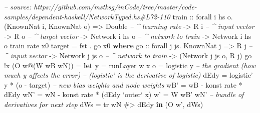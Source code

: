 \documentclass[]{article}
\newenvironment{Shaded}{}{}
\newcommand{\KeywordTok}[1]{\textcolor[rgb]{0.00,0.44,0.13}{\textbf{{#1}}}}
\newcommand{\DataTypeTok}[1]{\textcolor[rgb]{0.56,0.13,0.00}{{#1}}}
\newcommand{\CommentTok}[1]{\textcolor[rgb]{0.38,0.63,0.69}{\textit{{#1}}}}
\newcommand{\OtherTok}[1]{\textcolor[rgb]{0.00,0.44,0.13}{{#1}}}
\newcommand{\FunctionTok}[1]{\textcolor[rgb]{0.02,0.16,0.49}{{#1}}}
\newcommand{\NormalTok}[1]{{#1}}
\begin{document}
\begin{Shaded}
\begin{Highlighting}[]
\CommentTok{-- source: https://github.com/mstksg/inCode/tree/master/code-samples/dependent-haskell/NetworkTyped.hs#L72-110}
\OtherTok{train ::} \NormalTok{forall i hs o}\FunctionTok{.} \NormalTok{(}\DataTypeTok{KnownNat} \NormalTok{i, }\DataTypeTok{KnownNat} \NormalTok{o)}
      \OtherTok{=>} \DataTypeTok{Double}           \CommentTok{-- ^ learning rate}
      \OtherTok{->} \DataTypeTok{R} \NormalTok{i              }\CommentTok{-- ^ input vector}
      \OtherTok{->} \DataTypeTok{R} \NormalTok{o              }\CommentTok{-- ^ target vector}
      \OtherTok{->} \DataTypeTok{Network} \NormalTok{i hs o   }\CommentTok{-- ^ network to train}
      \OtherTok{->} \DataTypeTok{Network} \NormalTok{i hs o}
\NormalTok{train rate x0 target }\FunctionTok{=} \NormalTok{fst }\FunctionTok{.} \NormalTok{go x0}
  \KeywordTok{where}
\OtherTok{    go  ::} \NormalTok{forall j js}\FunctionTok{.} \DataTypeTok{KnownNat} \NormalTok{j}
        \OtherTok{=>} \DataTypeTok{R} \NormalTok{j              }\CommentTok{-- ^ input vector}
        \OtherTok{->} \DataTypeTok{Network} \NormalTok{j js o   }\CommentTok{-- ^ network to train}
        \OtherTok{->} \NormalTok{(}\DataTypeTok{Network} \NormalTok{j js o, }\DataTypeTok{R} \NormalTok{j)}
    \NormalTok{go }\FunctionTok{!}\NormalTok{x (}\DataTypeTok{O} \NormalTok{w}\FunctionTok{@}\NormalTok{(}\DataTypeTok{W} \NormalTok{wB wN))}
        \FunctionTok{=} \KeywordTok{let} \NormalTok{y    }\FunctionTok{=} \NormalTok{runLayer w x}
              \NormalTok{o    }\FunctionTok{=} \NormalTok{logistic y}
              \CommentTok{-- the gradient (how much y affects the error)}
              \CommentTok{--   (logistic' is the derivative of logistic)}
              \NormalTok{dEdy }\FunctionTok{=} \NormalTok{logistic' y }\FunctionTok{*} \NormalTok{(o }\FunctionTok{-} \NormalTok{target)}
              \CommentTok{-- new bias weights and node weights}
              \NormalTok{wB'  }\FunctionTok{=} \NormalTok{wB }\FunctionTok{-} \NormalTok{konst rate }\FunctionTok{*} \NormalTok{dEdy}
              \NormalTok{wN'  }\FunctionTok{=} \NormalTok{wN }\FunctionTok{-} \NormalTok{konst rate }\FunctionTok{*} \NormalTok{(dEdy }\OtherTok{`outer`} \NormalTok{x)}
              \NormalTok{w'   }\FunctionTok{=} \DataTypeTok{W} \NormalTok{wB' wN'}
              \CommentTok{-- bundle of derivatives for next step}
              \NormalTok{dWs  }\FunctionTok{=} \NormalTok{tr wN }\FunctionTok{#>} \NormalTok{dEdy}
          \KeywordTok{in}  \NormalTok{(}\DataTypeTok{O} \NormalTok{w', dWs)}

\end{Highlighting}
\end{Shaded}
\end{document}
